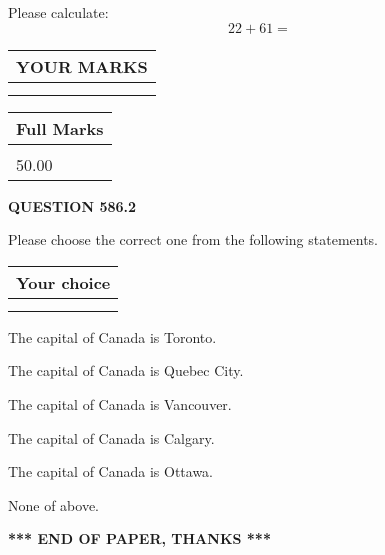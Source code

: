 \documentclass[12pt]{article}
\begin{document}
  
 
Please calculate:
\begin{equation}
22 +  %
61 = \nonumber
\end{equation}
 

 

 
  
\vspace{0.2in}
  
\noindent\begin{tabular}{|l|}
\hline
 YOUR MARKS  \\
\hline
 \\ 
 \\ 
\hline
\end{tabular}
\hspace{0.05in} \begin{tabular}{|l|}
\hline
 Full Marks  \\
\hline
 \\ 
50.00 \\
\hline
\end{tabular}
{\textbf{\Large{QUESTION
586.2 
}}}
  
  
Please choose the correct one from the following statements.
  
  
\noindent\hspace{3.0in} \begin{tabular}{|l|}
\hline
Your choice \\
\hline
 \\ 
 \\ 
\hline
\end{tabular}
  
  
 
 
The capital of Canada is Toronto.
 
 
The capital of Canada is Quebec City.
 
 
The capital of Canada is Vancouver.
 
 
The capital of Canada is Calgary.
 
 
The capital of Canada is Ottawa.
 
 
 None of above.
 
 
   
   
 \vspace{0.2in}
 
   
   
   
   
\vspace{1.0in} 
{\textbf{\large{ *** END OF PAPER, THANKS *** }}} 
   
\end{document}
